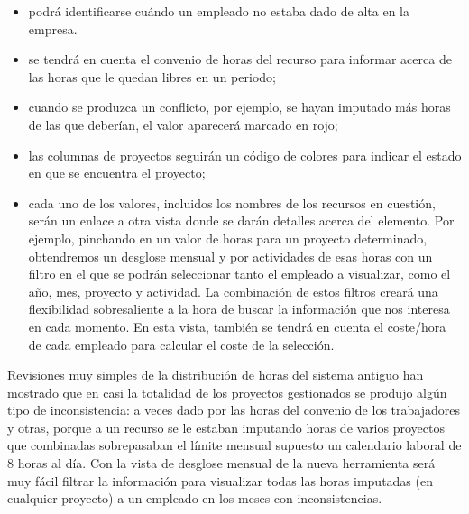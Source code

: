 \begin{itemize}
\item podrá identificarse cuándo un empleado no estaba dado de alta en la
empresa.

\item se tendrá en cuenta el convenio de horas del recurso para informar acerca
de las horas que le quedan libres en un periodo;

\item cuando se produzca un conflicto, por ejemplo, se hayan imputado más horas
de las que deberían, el valor aparecerá marcado en rojo;

\item las columnas de proyectos seguirán un código de colores para indicar el
estado en que se encuentra el proyecto;

\item cada uno de los valores, incluidos los nombres de los recursos en
cuestión, serán un enlace a otra vista donde se darán detalles acerca
del elemento. Por ejemplo, pinchando en un valor de horas para un proyecto
determinado, obtendremos un desglose mensual y por actividades de esas horas con
un filtro en el que se podrán seleccionar tanto el empleado a visualizar, como
el año, mes, proyecto y actividad. La combinación de estos filtros creará una
flexibilidad sobresaliente a la hora de buscar la información que nos interesa
en cada momento. En esta vista, también se tendrá en cuenta el coste/hora de
cada empleado para calcular el coste de la selección.
\end{itemize}


Revisiones muy simples de la distribución de horas del sistema antiguo han
mostrado que en casi la totalidad de los proyectos gestionados se produjo algún
tipo de inconsistencia: a veces dado
por las horas del convenio de los trabajadores y otras, porque a un
recurso se le estaban imputando horas de varios proyectos que
combinadas sobrepasaban el límite mensual supuesto un calendario laboral de 8
horas al día. Con la vista de desglose mensual de la nueva herramienta será muy
fácil filtrar la información para visualizar todas las horas imputadas (en
cualquier proyecto) a un empleado en los meses con inconsistencias.

